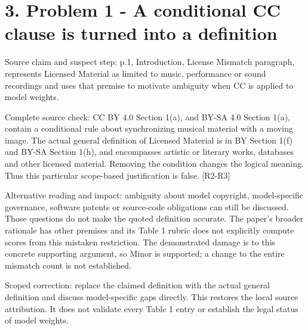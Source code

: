 \documentclass[10pt]{article}
\begin{document}
\section*{3. Problem 1 - A conditional CC clause is turned into a definition}
Source claim and suspect step: p.1, Introduction, License Mismatch paragraph, represents Licensed Material as limited to music, performance or sound recordings and uses that premise to motivate ambiguity when CC is applied to model weights.\par
Complete source check: CC BY 4.0 Section 1(a), and BY-SA 4.0 Section 1(a), contain a conditional rule about synchronizing musical material with a moving image. The actual general definition of Licensed Material is in BY Section 1(f) and BY-SA Section 1(h), and encompasses artistic or literary works, databases and other licensed material. Removing the condition changes the logical meaning. Thus this particular scope-based justification is false. [R2-R3]\par
Alternative reading and impact: ambiguity about model copyright, model-specific governance, software patents or source-code obligations can still be discussed. Those questions do not make the quoted definition accurate. The paper’s broader rationale has other premises and its Table 1 rubric does not explicitly compute scores from this mistaken restriction. The demonstrated damage is to this concrete supporting argument, so Minor is supported; a change to the entire mismatch count is not established.\par
Scoped correction: replace the claimed definition with the actual general definition and discuss model-specific gaps directly. This restores the local source attribution. It does not validate every Table 1 entry or establish the legal status of model weights.\par
\end{document}
